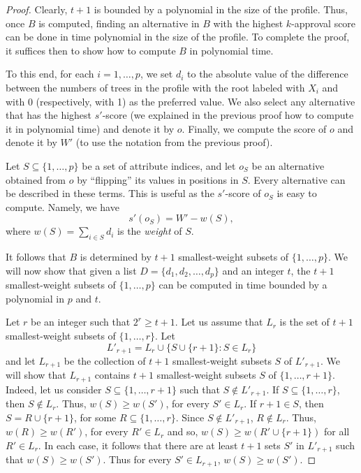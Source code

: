 \begin{proof}
Clearly, $t+1$ is bounded by a polynomial in the size of the profile. 
Thus, once $B$ is computed, finding an alternative in $B$ with the 
highest $k$-approval score can be done in time polynomial in the size 
of the profile. To complete the proof, it suffices then to show how to 
compute $B$ in polynomial time. 

To this end, for each $i=1,\ldots,p$, we set $d_i$ to the absolute value 
of the difference between the numbers of trees in the profile with the root 
labeled with $X_i$ and with 0 (respectively, with 1) as the preferred value. 
We also select any alternative that has the highest $s'$-score (we 
explained in the previous proof how to compute it in polynomial time)
and denote it by $o$. Finally, we compute the score of $o$ and denote it 
by $W'$ (to use the notation from the previous proof). 

Let $S\subseteq\{1,\ldots,p\}$ be a set of attribute indices, and let $o_S$
be an alternative obtained from $o$ by ``flipping'' its values in 
positions in $S$. Every alternative can be described in these terms.
This is useful as the $s'$-score of $o_S$ is easy to compute. Namely, 
we have
\[
s'(o_S) = W' - w(S),
\]
where $w(S)=\sum_{i\in S} d_i$ is the \emph{weight} of $S$.

It follows that $B$ is determined by $t+1$ smallest-weight subsets 
of $\{1,\ldots,p\}$. We will now show that given a list $D=\{d_1,d_2,
\ldots,d_p\}$ and an integer $t$, the $t+1$ smallest-weight subsets 
of $\{1,\ldots,p\}$ can be computed in time bounded by a polynomial in
$p$ and $t$.  

Let $r$ be an integer such that $2^r\geq t+1$. Let us assume that $L_r$ is
the set of $t+1$ smallest-weight subsets of $\{1,\ldots,r\}$. Let 
\[
L'_{r+1}=L_r \cup \{S\cup \{r+1\}\colon S\in L_r\}
\]
and let $L_{r+1}$ be the collection of $t+1$ smallest-weight subsets $S$
of $L'_{r+1}$. We will show that $L_{r+1}$ contains $t+1$ smallest-weight 
subsets $S$ of $\{1,\ldots,r+1\}$. Indeed, let us consider $S\subseteq\{1,
\ldots,r+1\}$ such that $S\notin L'_{r+1}$. If $S\subseteq \{1,\ldots, r\}$,
then $S\notin L_r$. Thus, $w(S)\geq w(S')$, for every $S'\in L_r$.
If $r+1\in S$, then $S=R\cup\{r+1\}$, for some $R\subseteq \{1,\ldots,r\}$.
Since $S\notin L'_{r+1}$, $R\notin L_r$. Thus, $w(R)\geq w(R')$, for every
$R'\in L_r$ and so, $w(S)\geq w(R'\cup\{r+1\})$ for all $R'\in L_r$.
In each case, it follows that there are at least $t+1$ sets $S'$ in 
$L'_{r+1}$ such that $w(S)\geq w(S')$. Thus for every $S'\in L_{r+1}$, 
$w(S)\geq w(S')$. 


\end{proof}
